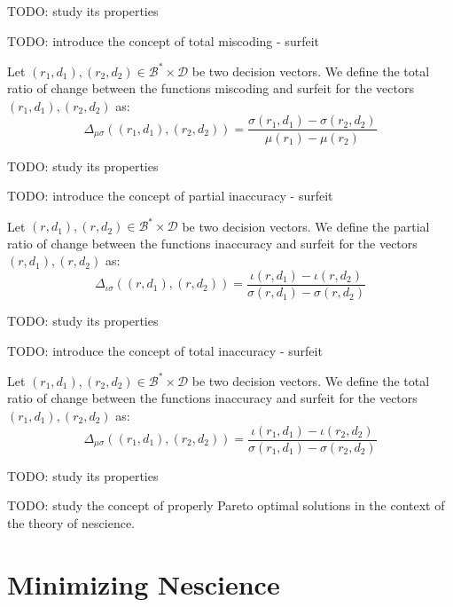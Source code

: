 {\color{red} TODO: study its properties}

{\color{red} TODO: introduce the concept of total miscoding - surfeit}

\begin{definition}
Let $(r_1, d_1), (r_2, d_2) \in \mathcal{B}^\ast \times \mathcal{D}$ be two decision vectors. We define the total ratio of change between the functions miscoding and surfeit for the vectors $(r_1, d_1), (r_2, d_2)$ as:
\[
\Delta_{\mu \sigma} \left( (r_1, d_1), (r_2, d_2) \right) = \frac{ \sigma(r_1, d_1) - \sigma(r_2, d_2) }{ \mu(r_1) - \mu(r_2) }
\] 
\end{definition}

{\color{red} TODO: study its properties}

{\color{red} TODO: introduce the concept of partial inaccuracy - surfeit}

\begin{definition}
Let $(r, d_1), (r, d_2) \in \mathcal{B}^\ast \times \mathcal{D}$ be two decision vectors. We define the partial ratio of change between the functions inaccuracy and surfeit for the vectors $(r, d_1), (r, d_2)$ as:
\[
\Delta_{\iota \sigma} \left( (r, d_1), (r, d_2) \right) = \frac{ \iota(r, d_1) - \iota(r, d_2) }{ \sigma(r, d_1) - \sigma(r, d_2) }
\] 
\end{definition}

{\color{red} TODO: study its properties}

{\color{red} TODO: introduce the concept of total inaccuracy - surfeit}

\begin{definition}
Let $(r_1, d_1), (r_2, d_2) \in \mathcal{B}^\ast \times \mathcal{D}$ be two decision vectors. We define the total ratio of change between the functions inaccuracy and surfeit for the vectors $(r_1, d_1), (r_2, d_2)$ as:
\[
\Delta_{\mu \sigma} \left( (r_1, d_1), (r_2, d_2) \right) = \frac{ \iota(r_1, d_1) - \iota(r_2, d_2) }{ \sigma(r_1, d_1) - \sigma(r_2, d_2) }
\] 
\end{definition}

{\color{red} TODO: study its properties}

{\color{red} TODO: study the concept of properly Pareto optimal solutions in the context of the theory of nescience.}

%
%

\section{Minimizing Nescience}
\label{sec:minimizing_nescience}

